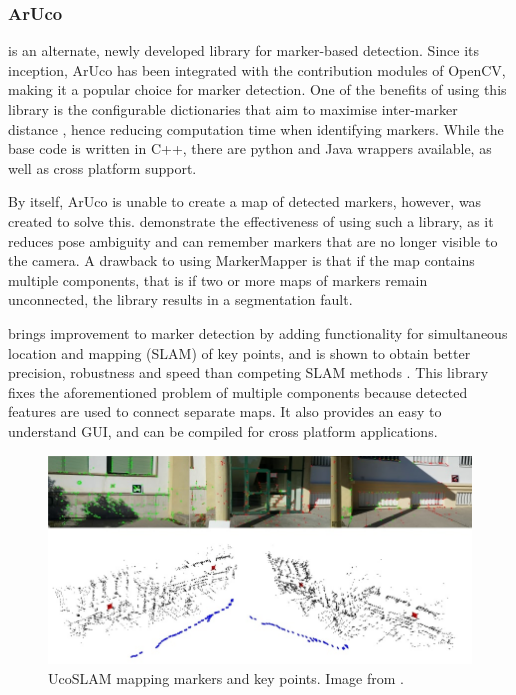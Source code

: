 \subsubsection{ArUco}\label{subsec:aruco}

\citet{aruco} is an alternate, newly developed library for marker-based detection. Since its inception, ArUco has been integrated with the contribution modules of OpenCV, making it a popular choice for marker detection. One of the benefits of using this library is the configurable dictionaries that aim to maximise inter-marker distance \citep{arucopaper}, hence reducing computation time when identifying markers. While the base code is written in C++, there are python and Java wrappers available, as well as cross platform support.

By itself, ArUco is unable to create a map of detected markers, however, \citet{markermapper} was created to solve this. \citet{markermapperpaper} demonstrate the effectiveness of using such a library, as it reduces pose ambiguity and can remember markers that are no longer visible to the camera. A drawback to using MarkerMapper is that if the map contains multiple components, that is if two or more maps of markers remain unconnected, the library results in a segmentation fault.

\citet{ucoslam} brings improvement to marker detection by adding functionality for simultaneous location and mapping (SLAM) of key points, and is shown to obtain better precision, robustness and speed than competing SLAM methods \citep{ucoslampaper}. This library fixes the aforementioned problem of multiple components because detected features are used to connect separate maps. It also provides an easy to understand GUI, and can be compiled for cross platform applications.

\begin{figure}[ht]
    \centering
    \includegraphics[width=.8\linewidth]{images/litreview/ucoslammapping}
    \caption{UcoSLAM mapping markers and key points. Image from \protect\citep{ucoslampaper}.}
    \label{fig:ucoslam}
\end{figure}

